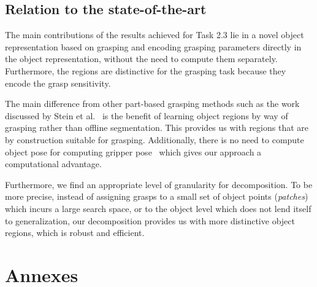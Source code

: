 \documentclass[a4paper,11pt,pdf]{pacmanreport}
\begin{document}

\subsection{Relation to the state-of-the-art}


The main contributions of the results achieved for Task 2.3 lie in a
novel object representation based on grasping and encoding grasping
parameters directly in the object representation, without the need to
compute them separately. Furthermore, the regions are distinctive for
the grasping task because they encode the grasp sensitivity.

The main difference from other part-based grasping methods such as the
work discussed by Stein et al.~\cite{lccp-grasp} is the benefit of
learning object regions by way of grasping rather than offline
segmentation. This provides us with regions that are by construction
suitable for grasping. Additionally, there is no need to compute
object pose for computing gripper
pose~\cite{saxena_grasp_novel_objects} which gives our approach a
computational advantage.

Furthermore, we find an appropriate level of granularity for
decomposition. To be more precise, instead of assigning grasps to a
small set of object points (\emph{patches})
\cite{saxena_deep_grasps,grasping_ng,grasping_mrf,kopicki2015a} which
incurs a large search space, or to the object level which does not
lend itself to generalization, our decomposition provides us with more
distinctive object regions, which is robust and efficient.




\newpage

\appendix
\section{Annexes}
\label{ann}


\end{document}
